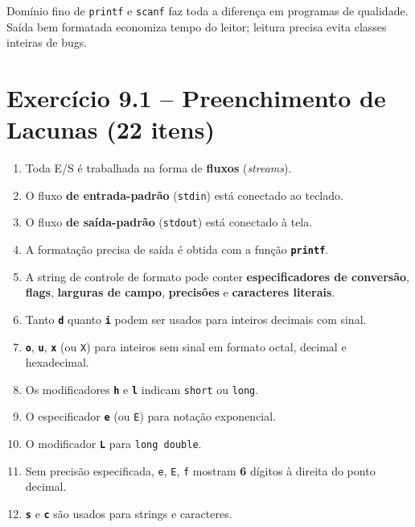 \documentclass[12pt,a4paper]{article}
\begin{document}
\begin{boaprática}
  Domínio fino de \texttt{printf} e \texttt{scanf} faz toda a diferença em
  programas de qualidade. Saída bem formatada economiza tempo do leitor; leitura
  precisa evita classes inteiras de bugs.
\end{boaprática}

\tableofcontents\newpage

\section{Exercício 9.1 -- Preenchimento de Lacunas (22 itens)}

\begin{respostabox}
\begin{enumerate}[label=\textbf{\alph*)}]
\item Toda E/S é trabalhada na forma de \textbf{fluxos} (\textit{streams}).
\item O fluxo \textbf{de entrada-padrão} (\texttt{stdin}) está conectado ao teclado.
\item O fluxo \textbf{de saída-padrão} (\texttt{stdout}) está conectado à tela.
\item A formatação precisa de saída é obtida com a função \textbf{\texttt{printf}}.
\item A string de controle de formato pode conter \textbf{especificadores de
conversão}, \textbf{flags}, \textbf{larguras de campo}, \textbf{precisões} e
\textbf{caracteres literais}.
\item Tanto \textbf{\texttt{d}} quanto \textbf{\texttt{i}} podem ser usados para
inteiros decimais com sinal.
\item \textbf{\texttt{o}}, \textbf{\texttt{u}}, \textbf{\texttt{x}} (ou \texttt{X})
para inteiros sem sinal em formato octal, decimal e hexadecimal.
\item Os modificadores \textbf{\texttt{h}} e \textbf{\texttt{l}} indicam
\texttt{short} ou \texttt{long}.
\item O especificador \textbf{\texttt{e}} (ou \texttt{E}) para notação exponencial.
\item O modificador \textbf{\texttt{L}} para \texttt{long double}.
\item Sem precisão especificada, \texttt{e}, \texttt{E}, \texttt{f} mostram
\textbf{6} dígitos à direita do ponto decimal.
\item \textbf{\texttt{s}} e \textbf{\texttt{c}} são usados para strings e caracteres.

\end{enumerate}
\end{respostabox}
\end{document}
